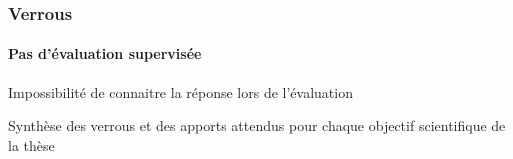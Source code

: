 \subsubsection{Verrous}

\paragraph{Pas d'évaluation supervisée}
Impossibilité de connaitre la réponse lors de l'évaluation


\begin{table}[h]
  \centering
  
  \caption{Synthèse des verrous et des apports attendus pour chaque
    objectif scientifique de la thèse}
  \label{tab:synthese_objectifs}
\end{table}

